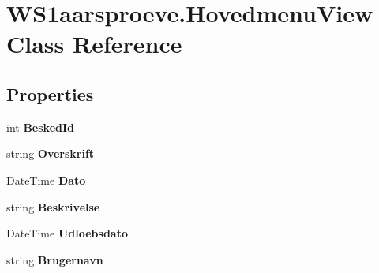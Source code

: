 \hypertarget{class_w_s1aarsproeve_1_1_hovedmenu_view}{}\section{W\+S1aarsproeve.\+Hovedmenu\+View Class Reference}
\label{class_w_s1aarsproeve_1_1_hovedmenu_view}
\subsection*{Properties}
\begin{DoxyCompactItemize}
\item 
\hypertarget{class_w_s1aarsproeve_1_1_hovedmenu_view_ad399bf150949d258110d3fcefd967a8b}{}int {\bfseries Besked\+Id}\label{class_w_s1aarsproeve_1_1_hovedmenu_view_ad399bf150949d258110d3fcefd967a8b}

\item 
\hypertarget{class_w_s1aarsproeve_1_1_hovedmenu_view_af55df9a6159cb381da62bf2b37fa64ec}{}string {\bfseries Overskrift}\label{class_w_s1aarsproeve_1_1_hovedmenu_view_af55df9a6159cb381da62bf2b37fa64ec}

\item 
\hypertarget{class_w_s1aarsproeve_1_1_hovedmenu_view_aefd9321dcbd3a46205605c0ce318bac1}{}Date\+Time {\bfseries Dato}\label{class_w_s1aarsproeve_1_1_hovedmenu_view_aefd9321dcbd3a46205605c0ce318bac1}

\item 
\hypertarget{class_w_s1aarsproeve_1_1_hovedmenu_view_a8cac8ef9ee4e9a0fbc890646318d1a3b}{}string {\bfseries Beskrivelse}\label{class_w_s1aarsproeve_1_1_hovedmenu_view_a8cac8ef9ee4e9a0fbc890646318d1a3b}

\item 
\hypertarget{class_w_s1aarsproeve_1_1_hovedmenu_view_af8392e91a7b2d44eec20bc55708b9d4f}{}Date\+Time {\bfseries Udloebsdato}\label{class_w_s1aarsproeve_1_1_hovedmenu_view_af8392e91a7b2d44eec20bc55708b9d4f}

\item 
\hypertarget{class_w_s1aarsproeve_1_1_hovedmenu_view_ad73da0d63c196c45699e4eede8eb3def}{}string {\bfseries Brugernavn}\label{class_w_s1aarsproeve_1_1_hovedmenu_view_ad73da0d63c196c45699e4eede8eb3def}


\end{DoxyCompactItemize}
